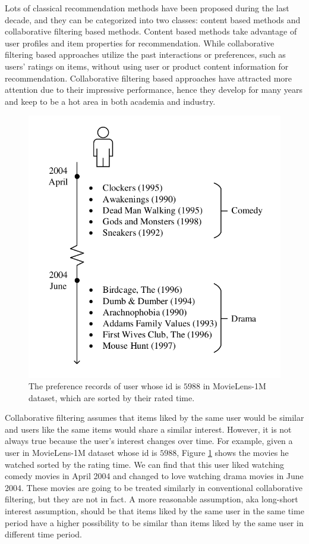 \documentclass{llncs}
\begin{document}
Lots of classical recommendation methods have been proposed
during the last decade, and they can be categorized into two classes:
content based methods and collaborative filtering based methods.
Content based methods \cite{pazzani2007content} take advantage of
user profiles and item properties for recommendation.
While collaborative filtering based approaches \cite{su2009survey} utilize
the past interactions or preferences, such as users' ratings on items,
without using user or product content information for recommendation.
Collaborative filtering based approaches have attracted more attention
due to their impressive performance, hence they develop for many years and
keep to be a hot area in both academia and industry.

\begin{figure}[htbp]
	\centering
	\includegraphics[scale=0.5]{images/example.pdf}
	\caption{The preference records of user whose id is $5988$ in MovieLens-1M dataset,
		which are sorted by their rated time.}
	\label{fig:example}
\end{figure}

Collaborative filtering assumes that items liked by the same user would be similar and
users like the same items would share a similar interest.
However, it is not always true because the user's interest changes over time.
For example, given a user in MovieLens-1M dataset whose id is $5988$,
Figure \ref{fig:example} shows the movies he watched sorted by the rating time.
We can find that this user liked watching comedy movies in April 2004 and
changed to love watching drama movies in June 2004.
These movies are going to be treated similarly in conventional collaborative filtering,
but they are not in fact.
A more reasonable assumption, aka long-short interest assumption, should be that
items liked by the same user in the same time period have a higher possibility
to be similar than items liked by the same user in different time period.
\end{document}
